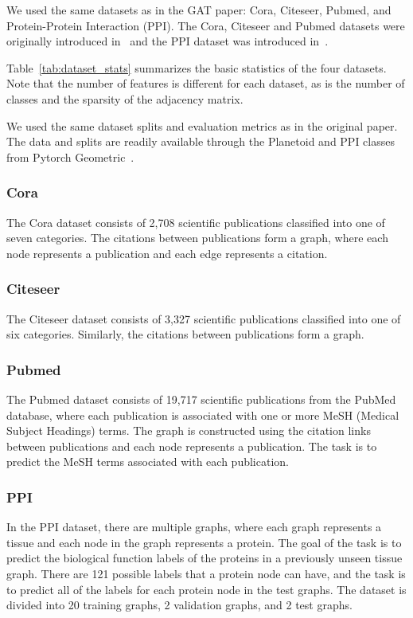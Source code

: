 We used the same datasets as in the GAT paper: Cora, Citeseer, Pubmed, and
Protein-Protein Interaction (PPI). The Cora, Citeseer and Pubmed datasets were
originally introduced in~\cite{sen2008collective} and the PPI dataset was
introduced in~\cite{hamilton2017inductive}.

Table~\ref{tab:dataset_stats} summarizes the basic statistics of the four
datasets. Note that the number of features is different for each dataset, as
is the number of classes and the sparsity of the adjacency matrix.

We used the same dataset splits and evaluation metrics as in the original
paper. The data and splits are readily available through the Planetoid and PPI
classes from Pytorch Geometric~\cite{pytorchgeometric}.

\subsubsection{Cora}
The Cora dataset consists of 2,708 scientific publications classified into one
of seven categories. The citations between publications form a graph, where
each node represents a publication and each edge represents a citation.

\subsubsection{Citeseer}
The Citeseer dataset consists of 3,327 scientific publications classified into
one of six categories. Similarly, the citations between publications form a
graph.

\subsubsection{Pubmed}
The Pubmed dataset consists of 19,717 scientific publications from the PubMed
database, where each publication is associated with one or more MeSH (Medical
Subject Headings) terms. The graph is constructed using the citation links
between publications and each node represents a publication. The task is to
predict the MeSH terms associated with each publication.

\subsubsection{PPI}
In the PPI dataset, there are multiple graphs, where each graph represents a
tissue and each node in the graph represents a protein. The goal of the task
is to predict the biological function labels of the proteins in a previously
unseen tissue graph. There are 121 possible labels that a protein node can
have, and the task is to predict all of the labels for each protein node in the
test graphs. The dataset is divided into 20 training graphs, 2 validation
graphs, and 2 test graphs.


